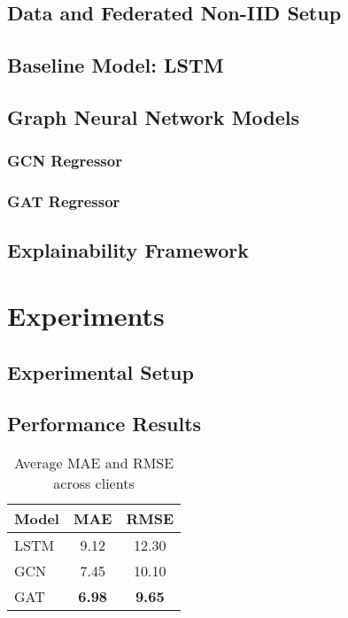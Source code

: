 \documentclass[journal]{IEEEtran}
\begin{document}
\subsection{Data and Federated Non-IID Setup}

\subsection{Baseline Model: LSTM}

\subsection{Graph Neural Network Models}
\subsubsection{GCN Regressor}

\subsubsection{GAT Regressor}

\subsection{Explainability Framework}

\section{Experiments}
\label{sec:experiments}
\subsection{Experimental Setup}

\subsection{Performance Results}
\begin{table}[!t]
  \caption{Average MAE and RMSE across clients}
  \label{tab:performance}
  \centering
  \begin{tabular}{lcc}
    \toprule
    Model & MAE & RMSE \\
    \midrule
    LSTM  & 9.12 & 12.30 \\
    GCN   & 7.45 & 10.10 \\
    GAT   & \textbf{6.98} & \textbf{9.65} \\
    \bottomrule
  \end{tabular}
\end{table}
\end{document}
